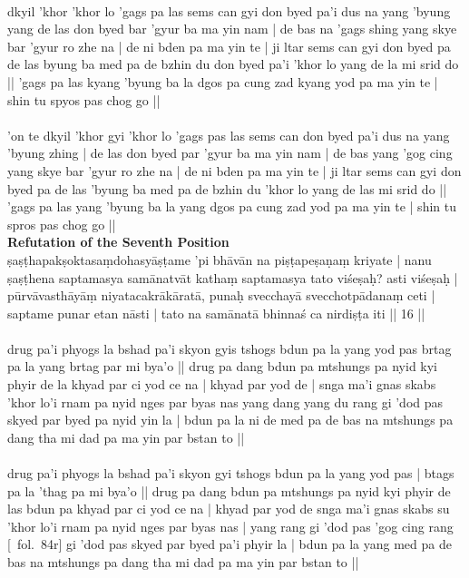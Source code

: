\documentclass[12pt]{article}
\begin{document}
\textbf{\TVA}\\
dkyil 'khor 'khor lo 'gags pa las sems can gyi don byed pa'i dus na yang 'byung yang de las don byed bar 'gyur ba ma yin nam | de bas na 'gags shing yang skye bar 'gyur ro zhe na | de ni bden pa ma yin te | ji ltar sems can gyi don byed pa de las byung ba med pa de bzhin du don byed pa'i 'khor lo yang de la mi srid do || 'gags pa las kyang 'byung ba la dgos pa cung zad kyang yod pa ma yin te | shin tu spyos pas chog go || \\

\textbf{\TVB}\\
'on te dkyil 'khor gyi 'khor lo 'gags pas las sems can don byed pa'i dus na yang 'byung zhing | de las don byed par 'gyur ba ma yin nam | de bas yang 'gog cing yang skye bar 'gyur ro zhe na | de ni bden pa ma yin te | ji ltar sems can gyi don byed pa de las 'byung ba med pa de bzhin du 'khor lo yang de las mi srid do || 'gags pa las yang 'byung ba la yang dgos pa cung zad yod pa ma yin te | shin tu spros pas chog go || \\

\textbf{Refutation of the Seventh Position}\\
ṣaṣṭhapakṣoktasaṃdohasyāṣṭame 'pi bhāvān na piṣṭapeṣaṇaṃ kriyate | nanu ṣaṣṭhena saptamasya samānatvāt kathaṃ saptamasya tato viśeṣaḥ? asti viśeṣaḥ | pūrvāvasthāyāṃ niyatacakrākāratā, punaḥ svecchayā svecchotpādanaṃ ceti | saptame punar etan nāsti | tato na samānatā bhinnaś ca nirdiṣṭa iti || 16 ||\\

\textbf{\TVA}\\
drug pa'i phyogs la bshad pa'i skyon gyis tshogs bdun pa la yang yod pas brtag pa la yang brtag par mi bya'o || drug pa dang bdun pa mtshungs pa nyid kyi phyir de la khyad par ci yod ce na | khyad par yod de | snga ma'i gnas skabs 'khor lo'i rnam pa nyid nges par byas nas yang dang yang du rang gi 'dod pas skyed par byed pa nyid yin la | bdun pa la ni de med pa de bas na mtshungs pa dang tha mi dad pa ma yin par bstan to || \\

\textbf{\TVB}\\
drug pa'i phyogs la bshad pa'i skyon gyi tshogs bdun pa la yang yod pas | btags pa la 'thag pa mi bya'o || drug pa dang bdun pa mtshungs pa nyid kyi phyir de las bdun pa khyad par ci yod ce na | khyad par yod de snga ma'i gnas skabs su 'khor lo'i rnam pa nyid nges par byas nas | yang rang gi 'dod pas 'gog cing rang [\TVB\ fol.\ 84r] gi 'dod pas skyed par byed pa'i phyir la | bdun pa la yang med pa de bas na mtshungs pa dang tha mi dad pa ma yin par bstan to || 
\end{document}
